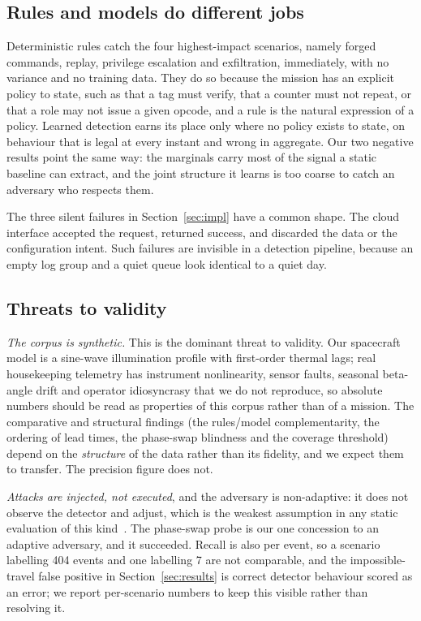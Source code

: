 \documentclass[10pt,journal]{IEEEtran}
\begin{document}
\subsection{Rules and models do different jobs}

Deterministic rules catch the four highest-impact scenarios, namely forged
commands, replay, privilege escalation and exfiltration, immediately, with no
variance and no training data. They do so because the mission has an explicit
policy to state, such as that a tag must verify, that a counter must not
repeat, or that a role may not issue a given opcode, and a rule is the natural
expression of a policy. Learned detection earns its place only where no policy
exists to state, on behaviour that is legal at every instant and wrong in
aggregate. Our two negative results point the same way: the marginals carry
most of the signal a static baseline can extract, and the joint structure it
learns is too coarse to catch an adversary who respects them.

The three silent failures in Section~\ref{sec:impl} have a common shape. The
cloud interface accepted the request, returned success, and discarded the data
or the configuration intent. Such failures are invisible in a detection
pipeline, because an empty log group and a quiet queue look identical to a
quiet day.

\subsection{Threats to validity}

\emph{The corpus is synthetic.} This is the dominant threat to validity. Our
spacecraft model is a sine-wave illumination profile with
first-order thermal lags; real housekeeping telemetry has instrument
nonlinearity, sensor faults, seasonal beta-angle drift and operator
idiosyncrasy that we do not reproduce, so absolute numbers should be read as
properties of this corpus rather than of a mission. The comparative and
structural findings (the rules/model complementarity, the ordering of lead
times, the phase-swap blindness and the coverage threshold) depend on the
\emph{structure} of the data rather than its fidelity, and we expect them to
transfer. The precision figure does not.

\emph{Attacks are injected, not executed}, and the adversary is non-adaptive:
it does not observe the detector and adjust, which is the weakest assumption in
any static evaluation of this kind~\cite{sommer2010closedworld}. The phase-swap
probe is our one concession to an adaptive adversary, and it succeeded. Recall
is also per event, so a scenario labelling 404 events and one labelling 7 are
not comparable, and the impossible-travel false positive in
Section~\ref{sec:results} is correct detector behaviour scored as an error; we
report per-scenario numbers to keep this visible rather than resolving it.
\end{document}
